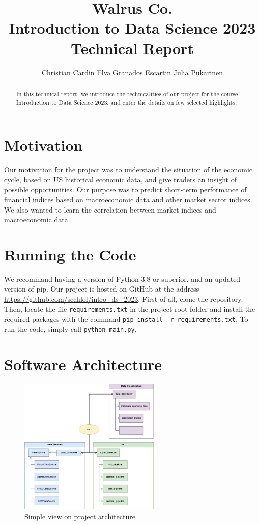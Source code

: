 \documentclass[10pt]{article} %
\title{Walrus Co. \\
Introduction to Data Science 2023 \\
Technical Report}
\author{\name Christian Cardin
      \AND
      \name Elva Granados Escartin
      \AND
      \name Julia Pukarinen}
\begin{document}
\maketitle

\begin{abstract}
In this technical report, we introduce the technicalities of our project for the course Introduction to Data Science 2023, and enter the details on few selected highlights.
\end{abstract}

\section{Motivation}

Our motivation for the project was to understand the situation of the economic cycle, based on US historical economic data, and give traders an insight of possible opportunities. Our purpose was to predict short-term performance of financial indices based on macroeconomic data and other market sector indices. We also wanted to learn the correlation between market indices and macroeconomic data.

\section{Running the Code}
We recommand having a version of Python 3.8 or superior, and an updated version of pip. Our project is hosted on GitHub at the address \href{https://github.com/sechlol/intro_ds_2023}{https://github.com/sechlol/intro\_ds\_2023}. First of all, clone the repository. Then, locate the file \texttt{requirements.txt} in the project root folder and install the required packages with the command \texttt{pip install -r requirements.txt}. To run the code, simply call \texttt{python main.py}.

\section{Software Architecture}

\begin{figure}[h]
  \begin{center}
    \includegraphics[width=0.6\textwidth]{img/arch.jpg}
  \end{center}
  \caption{Simple view on project architecture}
  \label{fig:arch}
  \end{figure}
\end{document}
